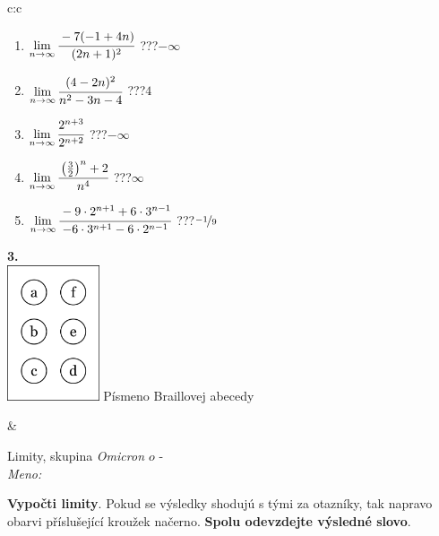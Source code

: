 \documentclass[10pt]{report}
\newcommand\omicron{o}
\begin{document}
\begin{tabular}{c:c}
\begin{minipage}[c][104.5mm][t]{0.5\linewidth}
\begin{center}
\begin{minipage}{0.79\linewidth}
\begin{center}
\begin{varwidth}{\linewidth}
\begin{enumerate}
\item $\lim\limits_{n\to\infty}\cfrac{-7(-1+4n)}{(2n+1)^2}$\quad \dotfill\; ???\;\dotfill \quad $-\infty$
\item $\lim\limits_{n\to\infty}\cfrac{(4-2n)^2}{n^2-3n-4}$\quad \dotfill\; ???\;\dotfill \quad $4$
\item $\lim\limits_{n\to\infty}\cfrac{2^{n+3}}{2^{n+2}}$\quad \dotfill\; ???\;\dotfill \quad $-\infty$
\item $\lim\limits_{n\to\infty}\cfrac{\left(\frac{3}{2}\right)^n +2}{n^{4}}$\quad \dotfill\; ???\;\dotfill \quad $\infty$
\item $\lim\limits_{n\to\infty}\cfrac{-9\cdot 2^{n+1}+6\cdot 3^{n-1}}{-6\cdot 3^{n+1}-6\cdot 2^{n-1}}$\quad \dotfill\; ???\;\dotfill \quad $\nicefrac{-1}{9}$
\end{enumerate}
\end{varwidth}
\end{center}
\end{minipage}
\begin{minipage}{0.20\linewidth}
\begin{center}
{\Huge\bfseries 3.} \\[2mm]
\includegraphics[height=40mm]{../images/braille.png}
{\small Písmeno Braillovej abecedy}
\end{center}
\end{minipage}
\end{center}
\end{minipage}
&
\begin{minipage}[c][104.5mm][t]{0.5\linewidth}
\begin{center}
\vspace{7mm}
{\huge Limity, skupina \textit{Omicron $\omicron$} -}\\[5mm]
\textit{Meno:}\phantom{xxxxxxxxxxxxxxxxxxxxxxxxxxxxxxxxxxxxxxxxxxxxxxxxxxxxxxxxxxxxxxxxx}\\[5mm]
\begin{minipage}{0.95\linewidth}
\begin{center}
\textbf{Vypočti limity}. Pokud se výsledky shodujú s tými za otazníky, tak napravo\\obarvi příslušející kroužek načerno. \textbf{Spolu odevzdejte výsledné slovo}.

\end{center}
\end{minipage}
\end{center}
\end{minipage}
\end{tabular}
\end{document}
